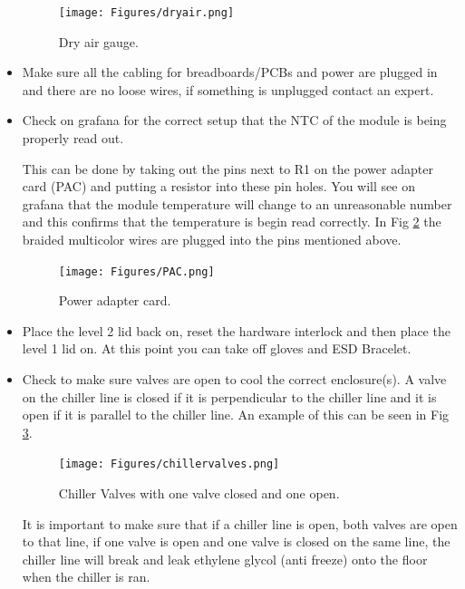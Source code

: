 \documentclass[12pt]{article}
\begin{document}
\begin{itemize}
\begin{figure}[H]
    \centering
    \texttt{[image: Figures/dryair.png]}
    \caption{Dry air gauge.}
    \label{fig:dry-air}
\end{figure}

    \item Make sure all the cabling for breadboards/PCBs and power are plugged in and there are no loose wires, if something is unplugged contact an expert.
    \item Check on grafana for the correct setup that the NTC of the module is being properly read out. 

    This can be done by taking out the pins next to R1 on the power adapter card (PAC) and putting a resistor into these pin holes. You will see on grafana that the module temperature will change to an unreasonable number and this confirms that the temperature is begin read correctly. In Fig \ref{fig:PAC} the braided multicolor wires are plugged into the pins mentioned above. 

\begin{figure}[H]
    \centering
    \texttt{[image: Figures/PAC.png]}
    \caption{Power adapter card.}
    \label{fig:PAC}
\end{figure}

    \item Place the level 2 lid back on, reset the hardware interlock and then place the level 1 lid on. At this point you can take off gloves and ESD Bracelet.

    \item Check to make sure valves are open to cool the correct enclosure(s). A valve on the chiller line is closed if it is perpendicular to the chiller line and it is open if it is parallel to the chiller line. An example of this can be seen in Fig \ref{fig:chillervalves}.
\begin{figure}[H]
    \centering
    \texttt{[image: Figures/chillervalves.png]}
    \caption{Chiller Valves with one valve closed and one open.}
    \label{fig:chillervalves}
\end{figure}

    
It is important to make sure that if a chiller line is open, both valves are open to that line, if one valve is open and one valve is closed on the same line, the chiller line will break and leak ethylene glycol (anti freeze) onto the floor when the chiller is ran. 

\end{itemize}
\end{document}
